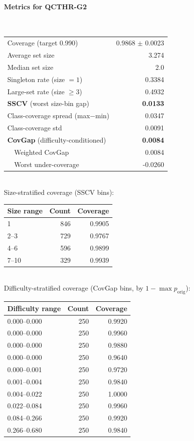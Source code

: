 \documentclass[parskip=half]{scrartcl}
\begin{document}
\paragraph{Metrics for QCTHR-G2}~\\
\begin{tabular}{l r}
\hline
Coverage (target 0.990) & 0.9868 $\pm$ 0.0023 \\
Average set size & 3.274 \\
Median set size & 2.0 \\
Singleton rate (size $=1$) & 0.3384 \\
Large-set rate (size $\geq 3$) & 0.4932 \\
\textbf{SSCV} (worst size-bin gap) & \textbf{0.0133} \\
Class-coverage spread (max$-$min) & 0.0347 \\
Class-coverage std & 0.0091 \\
\textbf{CovGap} (difficulty-conditioned) & \textbf{0.0084} \\
~~Weighted CovGap & 0.0084 \\
~~Worst under-coverage & -0.0260 \\
\hline
\end{tabular}\\[0.5em]
\textsf{\scriptsize Size-stratified coverage (SSCV bins):}\\
\begin{tabular}{l r r}
\hline
Size range & Count & Coverage \\
\hline
1 & 846 & 0.9905 \\
2--3 & 729 & 0.9767 \\
4--6 & 596 & 0.9899 \\
7--10 & 329 & 0.9939 \\
\hline
\end{tabular}\\[0.5em]
\textsf{\scriptsize Difficulty-stratified coverage (CovGap bins, by $1-\max p_{\mathrm{orig}}$):}\\
\begin{tabular}{l r r}
\hline
Difficulty range & Count & Coverage \\
\hline
0.000--0.000 & 250 & 0.9920 \\
0.000--0.000 & 250 & 0.9960 \\
0.000--0.000 & 250 & 0.9880 \\
0.000--0.000 & 250 & 0.9640 \\
0.000--0.001 & 250 & 0.9720 \\
0.001--0.004 & 250 & 0.9840 \\
0.004--0.022 & 250 & 1.0000 \\
0.022--0.084 & 250 & 0.9960 \\
0.084--0.266 & 250 & 0.9920 \\
0.266--0.680 & 250 & 0.9840 \\
\hline
\end{tabular}\\[0.5em]
\end{document}
